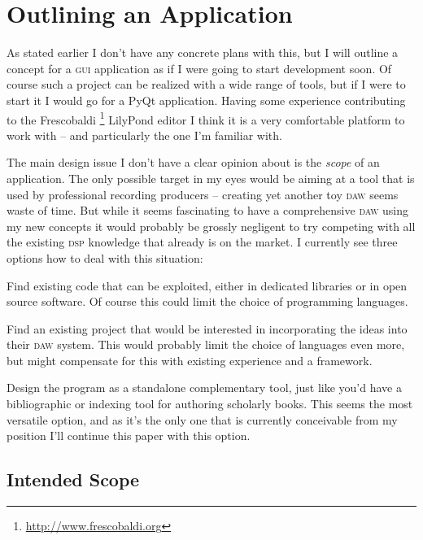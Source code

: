 \documentclass[11pt,a4paper]{article}
\begin{document}
\section{Outlining an Application}

As stated earlier I don't have any concrete plans with this, but I will outline a concept for a \textsc{gui} application as if I were going to start development soon.
Of course such a project can be realized with a wide range of tools, but if I were to start it I would go for a PyQt application.
Having some experience contributing to the Frescobaldi%
\footnote{\url{http://www.frescobaldi.org}}
LilyPond editor I think it is a very comfortable platform to work with -- and particularly the one I'm familiar with.

The main design issue I don't have a clear opinion about is the \emph{scope} of an application.
The only possible target in my eyes would be aiming at a tool that is used by professional recording producers -- creating yet another toy \textsc{daw} seems waste of time.
But while it seems fascinating to have a comprehensive \textsc{daw} using my new concepts it would probably be grossly negligent to try competing with all the existing \textsc{dsp} knowledge that already is on the market.
I currently see three options how to deal with this situation:

\begin{itemize*}
\item Find existing code that can be exploited, either in dedicated libraries or in open source software.
Of course this could limit the choice of programming languages.
\item Find an existing project that would be interested in incorporating the ideas into their \textsc{daw} system.
This would probably limit the choice of languages even more, but might compensate for this with existing experience and a framework.
\item Design the program as a standalone complementary tool, just like you'd have a bibliographic or indexing tool for authoring scholarly books.
This seems the most versatile option, and as it's the only one that is currently conceivable from my position I'll continue this paper with this option.
\end{itemize*}


\subsection{Intended Scope}
\end{document}
